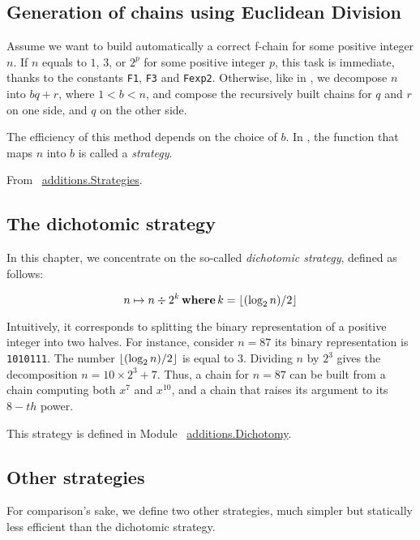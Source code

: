 
\subsection{Generation of chains using Euclidean Division}

Assume we want to build automatically a correct  f-chain for some 
positive integer $n$.
If $n$ equals to $1$, $3$, or $2^p$ for some positive integer  $p$,
this task is immediate, thanks to the constants \texttt{F1}, 
\texttt{F3} and \texttt{Fexp2}.
Otherwise, like in \cite{DBLP:journals/ita/BrlekCHM95}, we decompose 
$n$ into $bq+r$, where $1<b<n$, and compose the recursively built
chains for $q$ and $r$ on one side, and $q$ on the other side.

The efficiency of this method depends on the choice of $b$.
In \cite{DBLP:journals/ita/BrlekCHM95}, the function that maps $n$ into $b$
is called a \emph{strategy}. 

\vspace{4pt}
\noindent
From ~\href{../theories/html/additions.Strategies.html}{additions.Strategies}.


\subsection{The dichotomic strategy}


In this chapter, we concentrate
on the so-called \emph{dichotomic strategy}, defined as follows:

$$n \mapsto  n \div {2^k} \,\textbf{where}\, k=\lfloor(\log_2{n})/2\rfloor$$

Intuitively, it corresponds to splitting the binary representation of a positive
integer into two halves. For instance, consider $n=87$ its binary representation
is \texttt{1010111}. The number $\lfloor(\log_2{n})/2\rfloor$ is equal to $3$.
Dividing $n$ by $2^3$ gives the decomposition $n=10 \times 2^3 + 7$.
Thus, a chain for $n=87$ can be built from a chain computing both $x^7$ and $x^{10}$,
and a chain that raises its argument to its $8-th$ power.


This strategy is defined in Module ~\href{../theories/html/additions.Dichotomy.html}{additions.Dichotomy}.


\subsection{Other strategies}
For comparison's sake, we define two other strategies, much simpler but statically less efficient than the dichotomic strategy.

